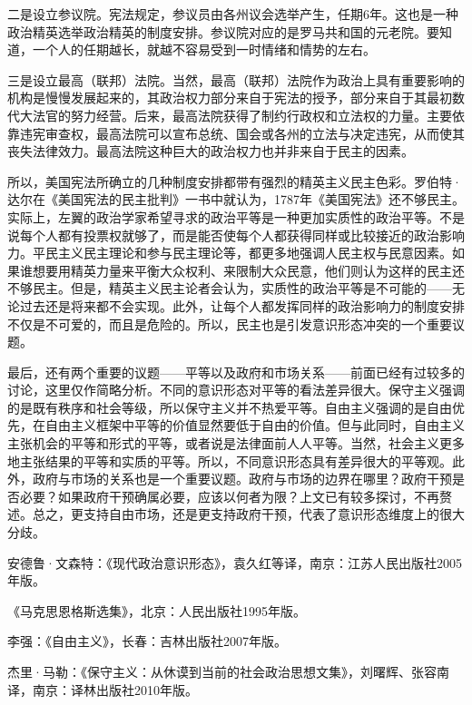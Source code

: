 二是设立参议院。宪法规定，参议员由各州议会选举产生，任期6年。这也是一种政治精英选举政治精英的制度安排。参议院对应的是罗马共和国的元老院。要知道，一个人的任期越长，就越不容易受到一时情绪和情势的左右。

三是设立最高（联邦）法院。当然，最高（联邦）法院作为政治上具有重要影响的机构是慢慢发展起来的，其政治权力部分来自于宪法的授予，部分来自于其最初数代大法官的努力经营。后来，最高法院获得了制约行政权和立法权的力量。主要依靠违宪审查权，最高法院可以宣布总统、国会或各州的立法与决定违宪，从而使其丧失法律效力。最高法院这种巨大的政治权力也并非来自于民主的因素。

所以，美国宪法所确立的几种制度安排都带有强烈的精英主义民主色彩。罗伯特·达尔在《美国宪法的民主批判》一书中就认为，1787年《美国宪法》还不够民主。实际上，左翼的政治学家希望寻求的政治平等是一种更加实质性的政治平等。不是说每个人都有投票权就够了，而是能否使每个人都获得同样或比较接近的政治影响力。平民主义民主理论和参与民主理论等，都更多地强调人民主权与民意因素。如果谁想要用精英力量来平衡大众权利、来限制大众民意，他们则认为这样的民主还不够民主。但是，精英主义民主论者会认为，实质性的政治平等是不可能的——无论过去还是将来都不会实现。此外，让每个人都发挥同样的政治影响力的制度安排不仅是不可爱的，而且是危险的。所以，民主也是引发意识形态冲突的一个重要议题。

最后，还有两个重要的议题——平等以及政府和市场关系——前面已经有过较多的讨论，这里仅作简略分析。不同的意识形态对平等的看法差异很大。保守主义强调的是既有秩序和社会等级，所以保守主义并不热爱平等。自由主义强调的是自由优先，在自由主义框架中平等的价值显然要低于自由的价值。但与此同时，自由主义主张机会的平等和形式的平等，或者说是法律面前人人平等。当然，社会主义更多地主张结果的平等和实质的平等。所以，不同意识形态具有差异很大的平等观。此外，政府与市场的关系也是一个重要议题。政府与市场的边界在哪里？政府干预是否必要？如果政府干预确属必要，应该以何者为限？上文已有较多探讨，不再赘述。总之，更支持自由市场，还是更支持政府干预，代表了意识形态维度上的很大分歧。


安德鲁·文森特：《现代政治意识形态》，袁久红等译，南京：江苏人民出版社2005年版。

《马克思恩格斯选集》，北京：人民出版社1995年版。

李强：《自由主义》，长春：吉林出版社2007年版。

杰里·马勒：《保守主义：从休谟到当前的社会政治思想文集》，刘曙辉、张容南译，南京：译林出版社2010年版。
